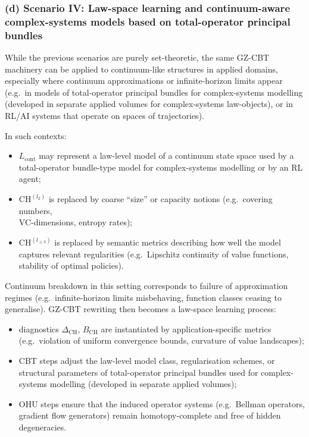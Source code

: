 \documentclass[11pt]{book}
\theoremstyle{plain}
\theoremstyle{definition}
\begin{document}
\subsubsection*{(d) Scenario IV: Law-space learning and continuum-aware complex-systems models based on total-operator principal bundles}

While the previous scenarios are purely set-theoretic, the same
GZ-CBT machinery can be applied to continuum-like structures in applied
domains, especially where continuum approximations or infinite-horizon
limits appear (e.g.\ in models of total-operator principal bundles for complex-systems modelling
(developed in separate applied volumes for complex-systems law-objects), or in
RL/AI systems that operate on spaces of trajectories).

In such contexts:

\begin{itemize}
  \item $L_{\mathrm{cont}}$ may represent a law-level model of a
        continuum state space used by a total-operator bundle-type model for complex-systems modelling or by an RL agent;
  \item $\mathrm{CH}^{(l_2)}$ is replaced by coarse “size” or capacity
        notions (e.g.\ covering numbers, \\ VC-dimensions, entropy rates);
  \item $\mathrm{CH}^{(l_{\ge3})}$ is replaced by semantic metrics
        describing how well the model captures relevant regularities
        (e.g.\ Lipschitz continuity of value functions, stability
        of optimal policies).
\end{itemize}

Continuum breakdown in this setting corresponds to failure of
approximation regimes (e.g.\ infinite-horizon limits misbehaving,
function classes ceasing to generalise). GZ-CBT rewriting then becomes
a law-space learning process:

\begin{itemize}
  \item diagnostics $\Delta_{\mathrm{CH}}$, $B_{\mathrm{CH}}$ are
        instantiated by application-specific metrics (e.g.\ violation
        of uniform convergence bounds, curvature of value landscapes);
  \item CBT steps adjust the law-level model class, regularisation
        schemes, or structural parameters of total-operator principal bundles used for complex-systems modelling (developed in separate applied volumes);
  \item OHU steps ensure that the induced operator systems (e.g.\ Bellman
        operators, gradient flow generators) remain homotopy-complete
        and free of hidden degeneracies.
\end{itemize}
\end{document}
